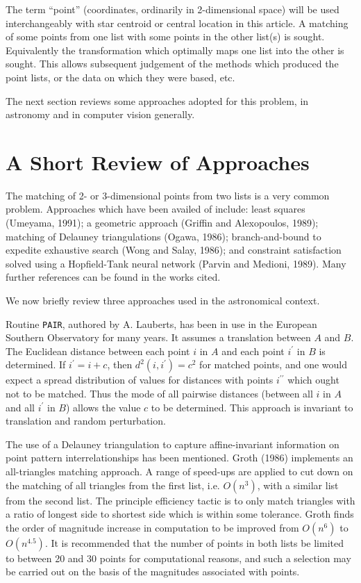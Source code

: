 The term ``point'' (coordinates, ordinarily in 2-dimensional space) 
will be used 
interchangeably with star centroid or central location in this article.
A matching of some points from one list with some points in the 
other list(s) is sought.  Equivalently the transformation which optimally 
maps one list into the other is sought.  This allows subsequent judgement
of the methods which produced the point lists, or the data on which they
were based, etc.

The next section reviews some approaches adopted for this problem, in 
astronomy and in computer vision generally.

\section{A Short Review of Approaches}

The matching of 2- or 3-dimensional points from two lists is a very common
problem.  Approaches which have been availed of include: least squares
(Umeyama, 1991); a geometric approach (Griffin and Alexopoulos, 1989); 
matching of Delauney triangulations (Ogawa, 1986); branch-and-bound to 
expedite exhaustive search (Wong and Salay, 1986); and constraint satisfaction
solved using a Hopfield-Tank neural network (Parvin and Medioni, 1989).
Many further references can be found in
the works cited.

We now briefly review three approaches used in the astronomical context.

Routine {\tt PAIR}, authored by A. Lauberts, has been in use in the European
Southern Observatory for many years.  It assumes a translation between
$A$ and $B$.  The Euclidean distance between each point $i$ in $A$ and each
point $i^{\prime}$ in $B$ is determined.  If $i^{\prime} = i + c$, then
$d^2(i,i^{\prime}) = c^2$ for matched points, and one would expect a 
spread distribution of values for distances with points $i^{\prime\prime}$ 
which ought
not to be matched.  Thus the mode of all pairwise distances (between all $i$ in
$A$ and all $i^{\prime}$ in $B$) allows the value $c$ to be determined.  This
approach is invariant to translation and random perturbation.  

The use of a Delauney triangulation to capture affine-invariant information
on point pattern interrelationships has been mentioned.  
Groth (1986) implements an all-triangles matching approach.  A range of
speed-ups are applied to cut down on the matching of all triangles from
the first list, i.e. $O(n^3)$, with a similar list from the second list.
The principle efficiency tactic is to only match triangles with a 
ratio of longest side to shortest side which is within some tolerance.  
Groth finds the order of magnitude increase in computation to be improved
from $O(n^6)$ to $O(n^{4.5})$.  It is recommended that the number of points
in both lists be limited to between 20 and 30 points for computational reasons,
and such a selection may be
carried out on the basis of the magnitudes associated with points.

